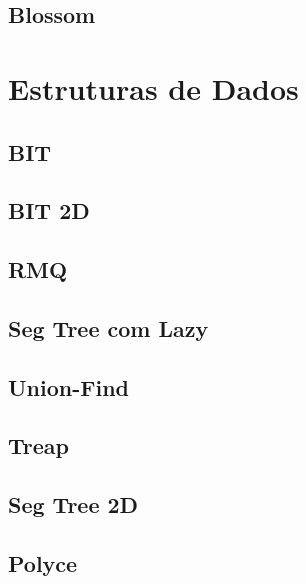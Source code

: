\subsection{Blossom}
\raggedbottom
\hrulefill

\section{Estruturas de Dados}
\subsection{BIT}
\raggedbottom
\hrulefill
\subsection{BIT 2D}
\raggedbottom
\hrulefill
\subsection{RMQ}
\raggedbottom
\hrulefill
\subsection{Seg Tree com Lazy}
\raggedbottom
\hrulefill
\subsection{Union-Find}
\raggedbottom
\hrulefill
\subsection{Treap}
\raggedbottom
\hrulefill
\subsection{Seg Tree 2D}
\raggedbottom
\hrulefill
\subsection{Polyce}
\raggedbottom
\hrulefill
